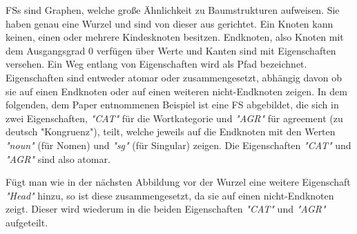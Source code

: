 \documentclass[12pt]{paper}
\begin{document}

FSs sind Graphen, welche große Ähnlichkeit zu Baumstrukturen aufweisen. Sie haben genau eine Wurzel und sind von dieser aus gerichtet. Ein Knoten kann keinen, einen oder mehrere Kindesknoten besitzen. Endknoten, also Knoten mit dem Ausgangsgrad 0 verfügen über Werte und Kanten sind mit Eigenschaften versehen. Ein Weg entlang von Eigenschaften wird als Pfad bezeichnet. Eigenschaften sind entweder atomar oder zusammengesetzt, abhängig davon ob sie auf einen Endknoten oder auf einen weiteren nicht-Endknoten zeigen. In dem folgenden, dem Paper entnommenen Beispiel ist eine FS abgebildet, die sich in zwei Eigenschaften, \textit{"CAT"} für die Wortkategorie und \textit{"AGR"} für agreement (zu deutsch "Kongruenz"), teilt, welche jeweils auf die Endknoten mit den Werten \textit{"noun"} (für Nomen) und \textit{"sg"} (für Singular) zeigen. Die Eigenschaften \textit{"CAT"} und \textit{"AGR"} sind also atomar.

\begin{center}
\end{center}

Fügt man wie in der nächsten Abbildung vor der Wurzel eine weitere Eigenschaft \textit{"Head"} hinzu, so ist diese zusammengesetzt, da sie auf einen nicht-Endknoten zeigt. Dieser wird wiederum in die beiden Eigenschaften \textit{"CAT"} und \textit{"AGR"} aufgeteilt. 

\begin{center}
\end{center}
\end{document}
